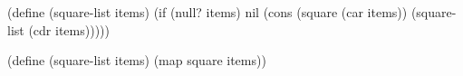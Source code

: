 \begtt\scm
(define (square-list items)
  (if (null? items)
      nil
      (cons (square (car items))
            (square-list (cdr items)))))

(define (square-list items)
  (map square items))
\endtt

